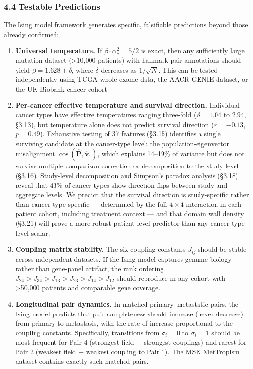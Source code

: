 \documentclass[
  11pt,
]{article}
\begin{document}
\subsubsection{4.4 Testable Predictions}\label{testable-predictions}

The Ising model framework generates specific, falsifiable predictions
beyond those already confirmed:

\begin{enumerate}
\def\labelenumi{\arabic{enumi}.}
\item
  \textbf{Universal temperature.} If \(\beta \cdot \alpha_c^2 = 5/2\) is
  exact, then any sufficiently large mutation dataset
  (\textgreater10,000 patients) with hallmark pair annotations should
  yield \(\beta = 1.628 \pm \delta\), where \(\delta\) decreases as
  \(1/\sqrt{N}\). This can be tested independently using TCGA
  whole-exome data, the AACR GENIE dataset, or the UK Biobank cancer
  cohort.
\item
  \textbf{Per-cancer effective temperature and survival direction.}
  Individual cancer types have effective temperatures ranging three-fold
  (\(\beta = 1.04\) to \(2.94\), §3.13), but temperature alone does not
  predict survival direction (\(r = -0.13\), \(p = 0.49\)). Exhaustive
  testing of 37 features (§3.15) identifies a single surviving candidate
  at the cancer-type level: the population-eigenvector misalignment
  \(\cos(\hat{\mathbf{P}}, \hat{\mathbf{v}}_1)\), which explains
  14--19\% of variance but does not survive multiple comparison
  correction or decomposition to the study level (§3.16). Study-level
  decomposition and Simpson's paradox analysis (§3.18) reveal that 43\%
  of cancer types show direction flips between study and aggregate
  levels. We predict that the survival direction is study-specific
  rather than cancer-type-specific --- determined by the full
  \(4 \times 4\) interaction in each patient cohort, including treatment
  context --- and that domain wall density (§3.21) will prove a more
  robust patient-level predictor than any cancer-type-level scalar.
\item
  \textbf{Coupling matrix stability.} The six coupling constants
  \(J_{ij}\) should be stable across independent datasets. If the Ising
  model captures genuine biology rather than gene-panel artifact, the
  rank ordering \(J_{24} > J_{34} > J_{13} > J_{23} > J_{14} > J_{12}\)
  should reproduce in any cohort with \textgreater50,000 patients and
  comparable gene coverage.
\item
  \textbf{Longitudinal pair dynamics.} In matched primary--metastatic
  pairs, the Ising model predicts that pair completeness should increase
  (never decrease) from primary to metastasis, with the rate of increase
  proportional to the coupling constants. Specifically, transitions from
  \(\sigma_i = 0\) to \(\sigma_i = 1\) should be most frequent for Pair
  4 (strongest field + strongest couplings) and rarest for Pair 2
  (weakest field + weakest coupling to Pair 1). The MSK MetTropism
  dataset contains exactly such matched pairs.
\end{enumerate}
\end{document}
